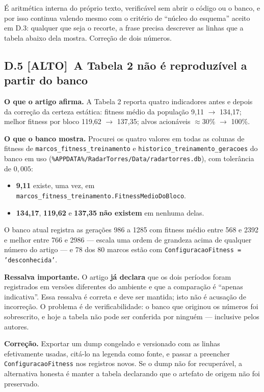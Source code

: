 \documentclass[11pt,a4paper]{article}
\newcommand{\alto}{\textbf{\color{orange!70!black}[ALTO]}}
\begin{document}
É aritmética interna do próprio texto, verificável sem abrir o código ou o banco, e por isso
continua valendo mesmo com o critério de ``núcleo do esquema'' aceito em D.3: qualquer que seja o
recorte, a frase precisa descrever as linhas que a tabela abaixo dela mostra. Correção de dois
números.

\subsection*{D.5 \alto\ A Tabela 2 não é reproduzível a partir do banco}

\textbf{O que o artigo afirma.} A Tabela 2 reporta quatro indicadores antes e depois da correção da
certeza estática: fitness médio da população 9,11 $\to$ 134,17; melhor fitness por bloco 119,62
$\to$ 137,35; alvos acionáveis $\approx 30\%$ $\to$ 100\%.

\textbf{O que o banco mostra.} Procurei os quatro valores em todas as colunas de fitness de
\texttt{marcos\_fitness\_treinamento} e \texttt{historico\_treinamento\_geracoes} do banco em uso
(\texttt{\%APPDATA\%/RadarTorres/Data/radartorres.db}), com tolerância de $0{,}005$:

\begin{itemize}
  \item \textbf{9,11} existe, uma vez, em \texttt{marcos\_fitness\_treinamento.FitnessMedioDoBloco}.
  \item \textbf{134,17}, \textbf{119,62} e \textbf{137,35} \textbf{não existem} em nenhuma delas.
\end{itemize}

O banco atual registra as gerações 986 a 1285 com fitness médio entre 568 e 2392 e melhor entre 766 e
2986 --- escala uma ordem de grandeza acima de qualquer número do artigo --- e 78 dos 80 marcos estão
com \texttt{ConfiguracaoFitness = 'desconhecida'}.

\textbf{Ressalva importante.} O artigo \textbf{já declara} que os dois períodos foram registrados em
versões diferentes do ambiente e que a comparação é ``apenas indicativa''. Essa ressalva é correta e
deve ser mantida; isto não é acusação de incorreção. O problema é de verificabilidade: o banco que
originou os números foi sobrescrito, e hoje a tabela não pode ser conferida por ninguém --- inclusive
pelos autores.

\textbf{Correção.} Exportar um dump congelado e versionado com as linhas efetivamente usadas, citá-lo
na legenda como fonte, e passar a preencher \texttt{ConfiguracaoFitness} nos registros novos. Se o
dump não for recuperável, a alternativa honesta é manter a tabela declarando que o artefato de origem
não foi preservado.
\end{document}
